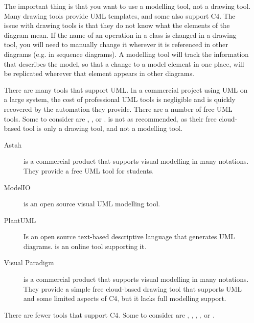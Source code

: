 The important thing is that you want to use a modelling tool, not a drawing tool.
Many drawing tools provide UML templates, and some also support C4.
The issue with drawing tools is that they do not know what the elements of the diagram mean.
If the name of an operation in a class is changed in a drawing tool, you will need to manually change it wherever it is referenced in other diagrams
(e.g. in sequence diagrams).
A modelling tool will track the information that describes the model, so that a change to a model element in one place,
will be replicated wherever that element appears in other diagrams.

There are many tools that support UML.
In a commercial project using UML on a large system, the cost of professional UML tools is negligible and is quickly recovered by the automation they provide.
There are a number of free UML tools. Some to consider are ,
, or .
 is not as recommended, as their free cloud-based tool is only a drawing tool, and not a modelling tool.

\begin{description}
    \item[Astah]
        is a commercial product that supports visual modelling in many notations. They provide a free UML tool for students.
    \item[ModelIO] is an open source visual UML modelling tool.
    \item[PlantUML] Is an open source text-based descriptive language that generates UML diagrams.
         is an online tool supporting it.
    \item[Visual Paradigm] is a commercial product that supports visual modelling in many notations.
        They provide a simple free cloud-based drawing tool that supports UML and some limited aspects of C4, but it lacks full modelling support.
\end{description}

\noindent
There are fewer tools that support C4. Some to consider are ,
, ,
, or .

